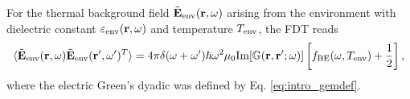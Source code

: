 For the thermal background field $\tilde{\mathbf{E}}_{\textrm{env}}(\mathbf{r},\omega)$ arising from the environment with dielectric constant $\varepsilon_{\textrm{env}}(\mathbf{r},\omega)$ and temperature $T_{\textrm{env}}$, the FDT reads \cite{novotny}
\begin{equation}
 \langle \tilde{\mathbf{E}}_{\textrm{env}}(\mathbf{r},\omega) \tilde{\mathbf{E}}_{\textrm{env}}(\mathbf{r}',\omega')^T \rangle = 4\pi \delta(\omega+\omega') \hbar \omega^2 \mu_0 \textrm{Im}[\mathbb{G}(\mathbf{r},\mathbf{r}';\omega)] \left[f_{\textrm{BE}}(\omega,T_{\textrm{env}})+ \frac{1}{2} \right], \label{eq:th_e0e0om}
\end{equation}
where the electric Green's dyadic was defined by Eq. \eqref{eq:intro_gemdef}. %



